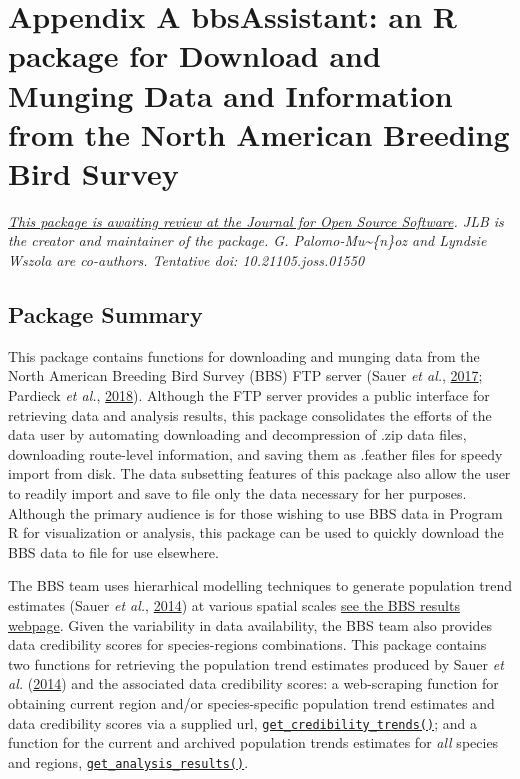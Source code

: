 \documentclass[12pt,twoside,openany]{reedthesis}
\begin{document}
\hypertarget{bbsAssistant}{%
\chapter*{Appendix A bbsAssistant: an R package for Download and Munging Data and Information from the North American Breeding Bird Survey}\label{bbsAssistant}}

\emph{\href{https://github.com/openjournals/joss-papers/tree/joss.01550/joss.01550}{This package is awaiting review at the Journal for Open Source Software}. JLB is the creator and maintainer of the package. G. Palomo-Mu\textasciitilde\{n\}oz and Lyndsie Wszola are co-authors. Tentative doi: 10.21105.joss.01550}

\hypertarget{package-summary}{%
\section{Package Summary}\label{package-summary}}

This package contains functions for downloading and munging data from the North American Breeding Bird Survey (BBS) FTP server (Sauer \emph{et al.}, \protect\hyperlink{ref-sauer2017first}{2017}; Pardieck \emph{et al.}, \protect\hyperlink{ref-pardieck2018north}{2018}). Although the FTP server provides a public interface for retrieving data and analysis results, this package consolidates the efforts of the data user by automating downloading and decompression of .zip data files, downloading route-level information, and saving them as .feather files for speedy import from disk. The data subsetting features of this package also allow the user to readily import and save to file only the data necessary for her purposes. Although the primary audience is for those wishing to use BBS data in Program R for visualization or analysis, this package can be used to quickly download the BBS data to file for use elsewhere.

The BBS team uses hierarhical modelling techniques to generate population trend estimates (Sauer \emph{et al.}, \protect\hyperlink{ref-sauer2017results}{2014}) at various spatial scales \href{https://www.mbr-pwrc.usgs.gov/}{see the BBS results webpage}. Given the variability in data availability, the BBS team also provides data credibility scores for species-regions combinations. This package contains two functions for retrieving the population trend estimates produced by Sauer \emph{et al.} (\protect\hyperlink{ref-sauer2017results}{2014}) and the associated data credibility scores: a web-scraping function for obtaining current region and/or species-specific population trend estimates and data credibility scores via a supplied url, \href{https://github.com/TrashBirdEcology/bbsAssistant/blob/master/R/get_credibility_trends.R}{\texttt{get\_credibility\_trends()}}; and a function for the current and archived population trends estimates for \emph{all} species and regions, \href{https://github.com/TrashBirdEcology/bbsAssistant/blob/master/R/get_analysis_results.R}{\texttt{get\_analysis\_results()}}.
\end{document}
